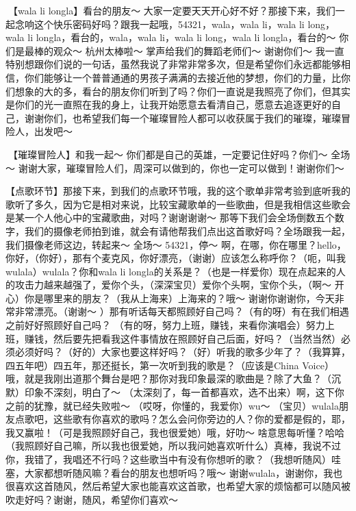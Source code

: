 \documentclass[
]{book}
\begin{document}
🎵【wala li longla】看台的朋友～ 大家一定要天天开心好不好？那接下来，我们一起念响这个快乐密码好吗？跟我一起哦，54321，wala，wala li，wala li long，wala li longla，看台的，wala，wala li，wala li long，wala li longla，看台的～ 你们是最棒的观众～ 杭州太棒啦～ 掌声给我们的舞蹈老师们～ 谢谢你们～ 我一直特别想跟你们说的一句话，虽然我说了非常非常多次，但是希望你们永远都能够相信，你们能够让一个普普通通的男孩子满满的去接近他的梦想，你们的力量，比你们想象的大的多，看台的朋友你们听到了吗？你们一直说是我照亮了你们，但其实是你们的光一直照在我的身上，让我开始愿意去看清自己，愿意去追逐更好的自己，谢谢你们，也希望我们每一个璀璨冒险人都可以收获属于我们的璀璨，璀璨冒险人，出发吧～

🎵【璀璨冒险人】和我一起～ 你们都是自己的英雄，一定要记住好吗？你们～ 全场～ 谢谢大家，璀璨冒险人们，周深可以做到的，你也一定可以做到！谢谢你们～

【点歌环节】那接下来，到我们的点歌环节哦，我的这个歌单非常考验到底听我的歌听了多久，因为它是相对来说，比较宝藏歌单的一些歌曲，但是我相信这些歌会是某一个人他心中的宝藏歌曲，对吗？谢谢谢谢～ 那等下我们会全场倒数五个数字，我们的摄像老师拍到谁，就会有请他帮我们点出这首歌好吗？全场跟我一起，我们摄像老师这边，转起来～ 全场～ 54321，停～ 啊，在哪，你在哪里？hello，你好，（你好），那有个麦克风，你好漂亮，（谢谢）应该怎么称呼你？（呃，叫我wulala）wulala？你和wala li longla的关系是？（也是一样爱你）现在点起来的人的攻击力越来越强了，爱你个头，（深深宝贝）爱你个头啊，宝你个头，（啊～ 开心）你是哪里来的朋友？（我从上海来）上海来的？哦～ 谢谢你谢谢你，今天非常非常漂亮。（谢谢～ ）那有听话每天都照顾好自己吗？（有的呀）有在我们相遇之前好好照顾好自己吗？ （有的呀，努力上班，赚钱，来看你演唱会）努力上班，赚钱，然后要先把看我这件事情放在照顾好自己后面，好吗？（当然当然）必须必须好吗？（好的）大家也要这样好吗？（好）听我的歌多少年了？（我算算，四五年吧）四五年，那还挺长，第一次听到我的歌是？（应该是China Voice）哦，就是我刚出道那个舞台是吧？那你对我印象最深的歌曲是？除了大鱼？（沉默）印象不深刻，明白了～ （太深刻了，每一首都喜欢，选不出来）啊，这下你之前的犹豫，就已经失败啦～ （哎呀，你懂的，我爱你）wu～ （宝贝）wulala朋友点歌吧，这些歌有你喜欢的歌吗？怎么会问你旁边的人？你的爱都是假的，耶，我又赢啦！（可是我照顾好自己，我也很爱她）哦，好叻～ 啥意思每听懂？哈哈（我照顾好自己嘛，所以我也很爱她，所以我问她喜欢听什么）真棒，我说不过你，我错了，我唱还不行吗？这些歌当中有没有你想听的歌？（我想听随风）哇塞，大家都想听随风嘛？看台的朋友也想听吗？哦～ 谢谢wulala，谢谢你，我也很喜欢这首随风，然后希望大家也能喜欢这首歌，也希望大家的烦恼都可以随风被吹走好吗？谢谢，随风，希望你们喜欢～
\end{document}
